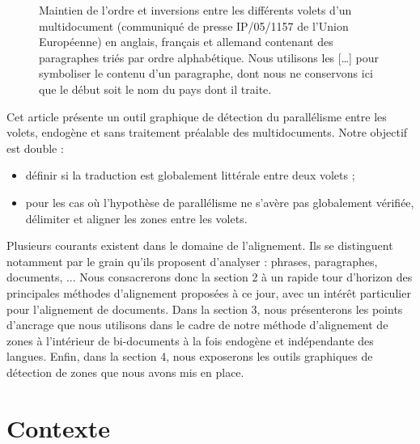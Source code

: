 \documentclass[10pt,a4paper,twoside]{article}
\begin{document}

\begin{figure}[!t]
  \begin{center}
  
\caption{
  \label{inversion.png}
  Maintien de l'ordre et inversions entre les différents volets
  d'un multidocument (communiqué de presse IP/05/1157 de l'Union
  Européenne) en anglais, français et allemand contenant des paragraphes
  triés par ordre alphabétique. Nous utilisons les [\dots] pour
  symboliser le contenu d'un paragraphe, dont nous ne conservons ici
  que le début soit le nom du pays dont il traite.} 
\end{center}
\end{figure}
Cet article présente un outil graphique de détection du parallélisme entre les volets, endogène et sans traitement préalable des multidocuments. Notre objectif est double : 
\begin{itemize}
\item définir si la traduction est globalement littérale entre deux volets ;
\item pour les cas où l'hypothèse de parallélisme ne s'avère pas globalement vérifiée, délimiter et aligner les zones entre les volets.  
\end{itemize}

Plusieurs courants existent dans le domaine de l'alignement. Ils se distinguent notamment par le grain qu'ils proposent d'analyser : phrases, paragraphes, documents, ... Nous consacrerons donc la section 2 à un rapide tour d'horizon des principales méthodes d'alignement proposées à ce jour, avec un intérêt particulier pour l'alignement de documents. Dans la section 3, nous présenterons les points d'ancrage que nous utilisons dans le cadre de notre méthode d'alignement de zones à l'intérieur de bi-documents à la fois endogène et indépendante des langues. Enfin, dans la section 4, nous exposerons les outils graphiques de détection de zones que nous avons mis en place. \\

\section{Contexte}
\end{document}

